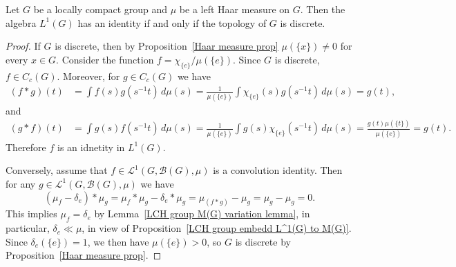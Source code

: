 \begin{proposition}\label{LCH group L^1(G) has identity iff discrete topo}
Let $G$ be a locally compact group and $\mu$ be a left Haar measure on $G$. Then the algebra $L^1(G)$ has an identity if and only if the topology of $G$ is discrete.
\end{proposition}
\begin{proof}
If $G$ is discrete, then by Proposition~\ref{Haar measure prop} $\mu(\{x\})\neq 0$ for every $x\in G$. Consider the function $f=\chi_{\{e\}}/\mu(\{e\})$. Since $G$ is discrete, $f\in C_c(G)$. Moreover, for $g\in C_c(G)$ we have
\begin{align*}
(f\ast g)(t)&=\int f(s)g(s^{-1}t)\,d\mu(s)=\frac{1}{\mu(\{e\})}\int\chi_{\{e\}}(s)g(s^{-1}t)\,d\mu(s)=g(t),
\end{align*}
and
\begin{align*}
(g\ast f)(t)&=\int g(s)f(s^{-1}t)\,d\mu(s)=\frac{1}{\mu(\{e\})}\int g(s)\chi_{\{e\}}(s^{-1}t)\,d\mu(s)=\frac{g(t)\mu(\{t\})}{\mu(\{e\})}=g(t).
\end{align*}
Therefore $f$ is an idnetity in $L^1(G)$.\par
Conversely, assume that $f\in\mathcal{L}^1(G,\mathcal{B}(G),\mu)$ is a convolution identity. Then for any $g\in\mathcal{L}^1(G,\mathcal{B}(G),\mu)$ we have
\[(\mu_f-\delta_e)\ast\mu_g=\mu_f\ast\mu_g-\delta_e\ast\mu_g=\mu_{(f\ast g)}-\mu_g=\mu_g-\mu_g=0.\]
This implies $\mu_f=\delta_e$ by Lemma~\ref{LCH group M(G) variation lemma}, in particular, $\delta_e\ll\mu$, in view of Proposition~\ref{LCH group embedd L^1(G) to M(G)}. Since $\delta_e(\{e\})=1$, we then have $\mu(\{e\})>0$, so $G$ is discrete by Proposition~\ref{Haar measure prop}.
\end{proof}